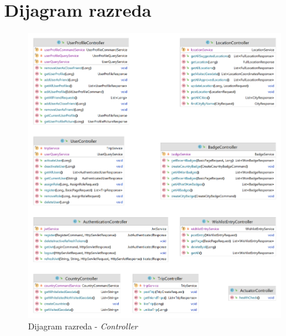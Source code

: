 		\section{Dijagram razreda}

                \begin{figure}[H]
        			\includegraphics[scale=0.2]{slike/class/class_controller.png} %
        		\centering
        		\caption{Dijagram razreda - \textit{Controller}}

        	\end{figure}

